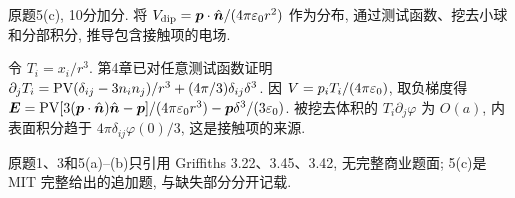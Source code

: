 \begin{exercise}
原题5(c), 10分加分. 将 $V_\mathrm{dip}=\boldsymbol{p}\cdot\hat{\boldsymbol{n}}/(4\pi\varepsilon_0 r^2)$ 作为分布, 通过测试函数、挖去小球和分部积分, 推导包含接触项的电场.
\end{exercise}
\begin{solution}
令 $T_i=x_i/r^3$. 第4章已对任意测试函数证明 $\partial_jT_i=\operatorname{PV}(\delta_{ij}-3n_in_j)/r^3+(4\pi/3)\delta_{ij}\delta^3$. 因 $V=p_iT_i/(4\pi\varepsilon_0)$, 取负梯度得 $\boldsymbol{E}=\operatorname{PV}[3(\boldsymbol{p}\cdot\hat{\boldsymbol{n}})\hat{\boldsymbol{n}}-\boldsymbol{p}]/(4\pi\varepsilon_0 r^3)-\boldsymbol{p}\delta^3/(3\varepsilon_0)$. 被挖去体积的 $T_i\partial_j\varphi$ 为 $O(a)$, 内表面积分趋于 $4\pi\delta_{ij}\varphi(0)/3$, 这是接触项的来源.
\end{solution}
原题1、3和5(a)--(b)只引用 Griffiths 3.22、3.45、3.42, 无完整商业题面; 5(c)是 MIT 完整给出的追加题, 与缺失部分分开记载.
